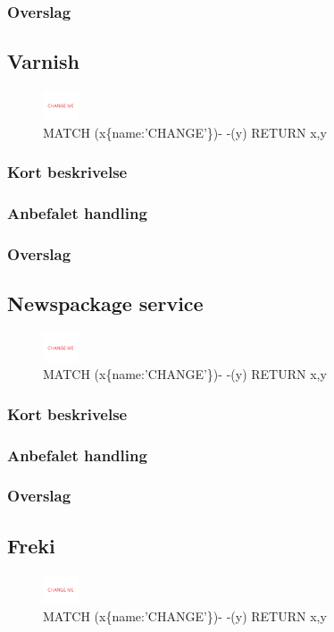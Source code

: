 \documentclass{article}
\begin{document}
\subsubsection{Overslag}


\subsection{Varnish}
\begin{figure}[h]
\includegraphics[width=30pt]{CHANGE.PNG}
\caption{MATCH (x\{name:'CHANGE'\})- -(y) RETURN x,y}
\end{figure}
\subsubsection{Kort beskrivelse}
\subsubsection{Anbefalet handling}
\subsubsection{Overslag}


\subsection{Newspackage service}
\begin{figure}[h]
\includegraphics[width=30pt]{CHANGE.PNG}
\caption{MATCH (x\{name:'CHANGE'\})- -(y) RETURN x,y}
\end{figure}
\subsubsection{Kort beskrivelse}
\subsubsection{Anbefalet handling}
\subsubsection{Overslag}


\subsection{Freki}
\begin{figure}[h]
\includegraphics[width=30pt]{CHANGE.PNG}
\caption{MATCH (x\{name:'CHANGE'\})- -(y) RETURN x,y}
\end{figure}
\end{document}
